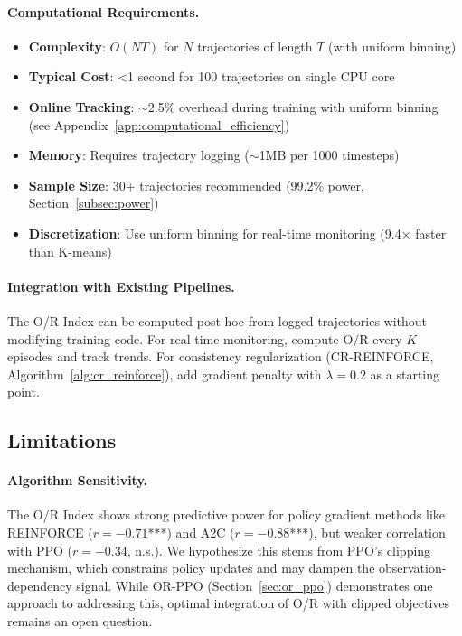 \documentclass[twoside]{article}
\theoremstyle{remark}
\begin{document}
\paragraph{Computational Requirements.}
\begin{itemize}
\item \textbf{Complexity}: $O(NT)$ for $N$ trajectories of length $T$ (with uniform binning)
\item \textbf{Typical Cost}: <1 second for 100 trajectories on single CPU core
\item \textbf{Online Tracking}: $\sim$2.5\% overhead during training with uniform binning (see Appendix~\ref{app:computational_efficiency})
\item \textbf{Memory}: Requires trajectory logging ($\sim$1MB per 1000 timesteps)
\item \textbf{Sample Size}: 30+ trajectories recommended (99.2\% power, Section~\ref{subsec:power})
\item \textbf{Discretization}: Use uniform binning for real-time monitoring (9.4× faster than K-means)
\end{itemize}

\paragraph{Integration with Existing Pipelines.}
The O/R Index can be computed post-hoc from logged trajectories without modifying training code. For real-time monitoring, compute O/R every $K$ episodes and track trends. For consistency regularization (CR-REINFORCE, Algorithm~\ref{alg:cr_reinforce}), add gradient penalty with $\lambda = 0.2$ as a starting point.

\subsection{Limitations}

\paragraph{Algorithm Sensitivity.}
The O/R Index shows strong predictive power for policy gradient methods like REINFORCE ($r=-0.71$***) and A2C ($r=-0.88$***), but weaker correlation with PPO ($r=-0.34$, n.s.). We hypothesize this stems from PPO's clipping mechanism, which constrains policy updates and may dampen the observation-dependency signal. While OR-PPO (Section~\ref{sec:or_ppo}) demonstrates one approach to addressing this, optimal integration of O/R with clipped objectives remains an open question.
\end{document}
